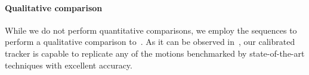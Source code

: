 \paragraph{Qualitative comparison}
While we do not perform quantitative comparisons, we employ the \handy{} sequences to perform a qualitative comparison to~\cite{qian2014realtime,sridhar2015fast,sharp2015accurate,taylor2016concerto}. As it can be observed in~\VideoExtra{}, our calibrated tracker is capable to replicate any of the motions benchmarked by state-of-the-art techniques with excellent accuracy.


